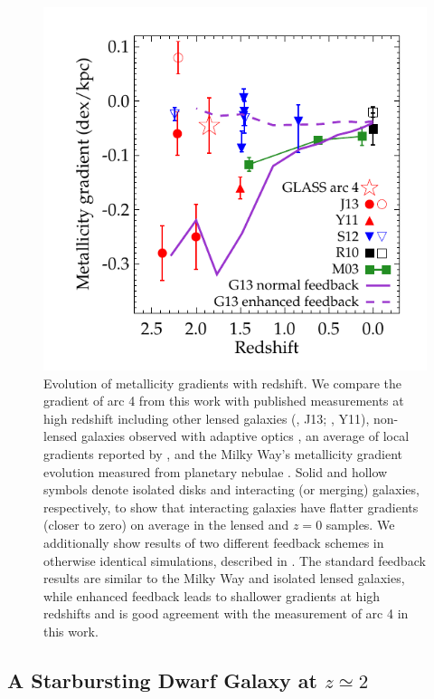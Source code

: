 \begin{figure}
    \centering
    \includegraphics[width=.8\textwidth]{figures/figure_gradient_evolution_corr.pdf}
    \caption[Evolution of metallicity gradients with redshift.]{Evolution of metallicity gradients with redshift. We compare the gradient of arc 4 from this work
    with published measurements at high redshift including other lensed galaxies (\citealt{Jones2013}, J13;
    \citealt{Yuan2011}, Y11), non-lensed galaxies observed with adaptive optics \citep[][S12]{Swinbank2012}, an
    average of local gradients reported by \citet[][R10]{Rupke2010b}, and the Milky Way's metallicity gradient
    evolution measured from planetary nebulae \citep[][M03]{Maciel2003}. Solid and hollow symbols denote isolated
    disks and interacting (or merging) galaxies, respectively, to show that interacting galaxies have flatter
    gradients (closer to zero) on average in the lensed and $z=0$ samples. We additionally show results of two
    different feedback schemes in otherwise identical simulations, described in \cite[][G13; the galaxy shown is
    g15784]{Gibson2013}. The standard feedback results are similar to the Milky Way and isolated lensed galaxies,
    while enhanced feedback leads to shallower gradients at high redshifts and is good agreement with the
    measurement of arc 4 in this work.  \label{fig:evolution}}
\end{figure}


\subsection{A Starbursting Dwarf Galaxy at $z\simeq2$}


